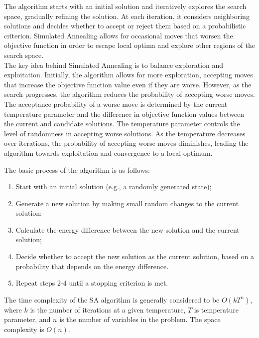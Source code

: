 \documentclass{article}
\begin{document}
The algorithm starts with an initial solution and iteratively explores the search space, gradually refining the solution. At each iteration, it considers neighboring solutions and decides whether to accept or reject them based on a probabilistic criterion. Simulated Annealing allows for occasional moves that worsen the objective function in order to escape local optima and explore other regions of the search space.\\

The key idea behind Simulated Annealing is to balance exploration and exploitation. Initially, the algorithm allows for more exploration, accepting moves that increase the objective function value even if they are worse. However, as the search progresses, the algorithm reduces the probability of accepting worse moves. \\

The acceptance probability of a worse move is determined by the current temperature parameter and the difference in objective function values between the current and candidate solutions. The temperature parameter controls the level of randomness in accepting worse solutions. As the temperature decreases over iterations, the probability of accepting worse moves diminishes, leading the algorithm towards exploitation and convergence to a local optimum.

The basic process of the algorithm is as follows:

\begin{enumerate}
    \item Start with an initial solution (e.g., a randomly generated state);
    \item Generate a new solution by making small random changes to the current solution;
    \item Calculate the energy difference between the new solution and the current solution;
    \item Decide whether to accept the new solution as the current solution, based on a probability that depends on the energy difference.
    \item Repeat steps 2-4 until a stopping criterion is met.
\end{enumerate}

The time complexity of the SA algorithm is generally considered to be $O(kT^n)$, where $k$ is the number of iterations at a given temperature, $T$ is temperature parameter, and $n$ is the number of variables in the problem. The space complexity is $O(n)$. \\
\end{document}
